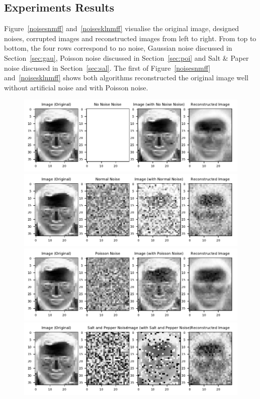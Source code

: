 \subsection{Experiments Results}
Figure~\ref{noisesnmff} and~\ref{noisesklnmff} visualise the original image, designed noises, corrupted images and reconstructed images from left to right. From top to bottom, the four rows correspond to no noise, Gaussian noise discussed in Section~\ref{sec:gau}, Poisson noise discussed in Section~\ref{sec:poi} and Salt \& Paper noise discussed in Section~\ref{sec:sal}.
The first of Figure~\ref{noisesnmff} and~\ref{noisesklnmff} shows both algorithms reconstructed the original image well without artificial noise and with Poisson noise. 
\begin{figure}
	\centering
	\includegraphics[scale=.9]{Result_Multiplication_Euclidean_No_Noise_Comparison}\\
	\includegraphics[scale=.9]{Result_Multiplication_Euclidean_Normal_Comparison}\\
	\includegraphics[scale=.9]{Result_Multiplication_Euclidean_Poisson_Comparison}\\
	\includegraphics[scale=.9]{Result_Multiplication_Euclidean_Salt_and_Pepper_Comparison}

\end{figure}
